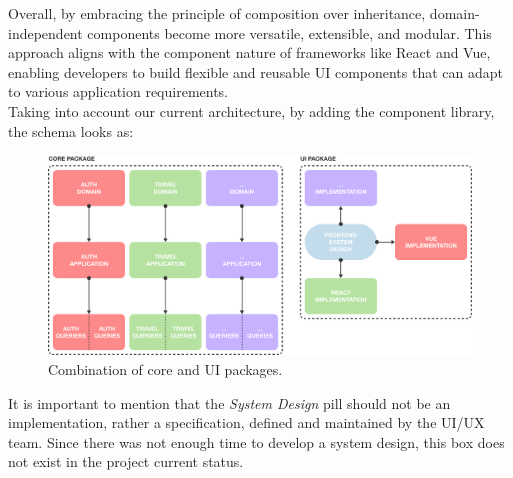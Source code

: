 \documentclass[../design.tex]{subfiles}
\begin{document}
Overall, by embracing the principle of composition over inheritance,
domain-independent components become more versatile, extensible, and modular.
This approach aligns with the component nature of frameworks like React
and Vue, enabling developers to build flexible and reusable UI components that
can adapt to various application requirements.
\\[8pt]
Taking into account our current architecture, by adding the component library,
the schema looks as:
\begin{figure}[H]
	\centering
	\includegraphics[width=\textwidth]{./assets/ui-core.png}
	\caption{Combination of core and UI packages.}
\end{figure}
It is important to mention that the \emph{System Design} pill should not be an
implementation, rather a specification, defined and maintained by the UI/UX
team. Since there was not enough time to develop a system design, this box does
not exist in the project current status.
\end{document}
